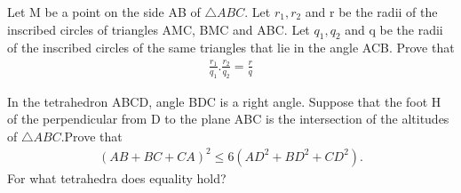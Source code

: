 \item Let M be a point on the side AB of $\triangle{ABC}.$ Let $r_1,r_2$ and r be the radii of the inscribed circles of triangles AMC, BMC and ABC. Let $q_1, q_2$ and q be the radii of the inscribed circles of the same triangles that lie in the angle ACB. Prove that
\begin{align*}
\frac{r_1}{q_1}.\frac{r_2}{q_2} = \frac{r}{q}
\end{align*}
\item In the tetrahedron ABCD, angle BDC is a right angle. Suppose that the foot H of the perpendicular from D to the plane ABC is the intersection of the altitudes of $\triangle{ABC}.$Prove that
\begin{align*}
(AB + BC + CA)^2 \leq 6(AD^2 + BD^2 + CD^2).
\end{align*}
For what tetrahedra does equality hold?

